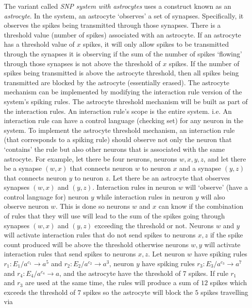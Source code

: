 \documentclass[a4paper]{article}
\theoremstyle{definition}
\newcommand{\ra}{\rightarrow}
\begin{document}
The variant called \emph{SNP system with astrocytes} \cite{pan-2012-astrocytes} uses a construct
known as an \emph{astrocyte}. In the system, an astrocyte `observes' a set of synapses. Specifically,
it observes the spikes being transmitted through those synapses. There is a threshold value (number
of spikes) associated with an astrocyte. If an astrocyte has a threshold value of $x$ spikes, it 
will only allow spikes to be transmitted through the synapses it is observing if the sum of the 
number of spikes `flowing' through those synapses is not above the threshold of $x$ spikes. If the
number of spikes being transmitted is above the astrocyte threshold, then all spikes being 
transmitted are blocked by the astrocyte (essentially erased). The astrocyte mechanism can be 
implemented by modifying the interaction rule version of the system's spiking rules. The astrocyte
threshold mechanism will be built as part of the interaction rules. An interaction rule's
scope is the entire system. i.e. An interaction rule can have a control language (checking set) for 
any neuron in the system. To implement the astrocyte threshold mechanism, an interaction rule 
(that corresponds to a spiking rule) should observe not only the neuron that `contains' the rule but
also other neurons that is associated with the same astrocyte. For example, let there be four 
neurons, neurons $w, x, y, z$, and  let there be a synapse $(w,x)$ that connects neuron $w$ to
 neuron $x$ and a synapse $(y,z)$ that connects neuron $y$ to neuron $z$. Let there be an astrocyte 
that observes synapses $(w,x)$ and $(y,z)$. Interaction rules in neuron $w$ will `observe' (have a 
control language for) neuron $y$ while interaction rules in neuron $y$ will also observe neuron $w$. 
This is done so neurons $w$ and $x$ can know if the combination of rules that they will use will 
lead to the sum of the spikes going through synapses $(w,x)$ and $(y,z)$ exceeding the threshold or 
not. Neurons $w$ and $y$ will activate interaction rules that do not send spikes to neurons $x,z$ if 
the spike count produced will be above the threshold otherwise neurons $w,y$ will activate 
interaction rules that send spikes to neurons $x,z$. Let neuron $w$ have spiking rules 
$r_1: E_1/a^{c_1} \ra a^5$ and $r_2: E_2/a^{c_2} \ra a^3$, neuron $y$ have spiking rules 
$r_3: E_3/a^{c_3} \ra a^7$ and $r_4: E_4/a^{c_4} \ra a$, and the astrocyte have the threshold of
7 spikes. If rule $r_1$ and $r_3$ are used at the same time, the rules will produce a sum of $12$ spikes
which exceeds the threshold of $7$ spikes so the astrocyte will block the $5$ spikes travelling via 
\end{document}
